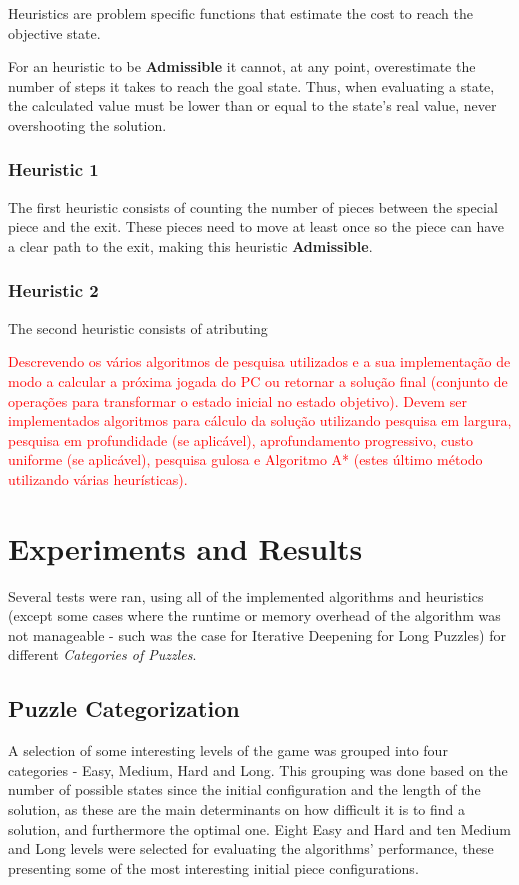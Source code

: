 \documentclass[conference]{IEEEtran}
\begin{document}
Heuristics are problem specific functions that estimate the cost to reach the objective state.

For an heuristic to be \textbf{Admissible} it cannot, at any point, overestimate the number of steps it takes to reach the goal state. Thus, when evaluating a state, the calculated value must be lower than or equal to the state's real value, never overshooting the solution.

\subsubsection{Heuristic 1}

The first heuristic consists of counting the number of pieces between the special piece and the exit. These pieces need to move at least once so the piece can have a clear path to the exit, making this heuristic \textbf{Admissible}.

\subsubsection{Heuristic 2}

The second heuristic consists of atributing 

\textcolor{red}{Descrevendo os vários algoritmos de pesquisa utilizados e a sua implementação de modo a calcular a próxima jogada do PC ou retornar a solução final (conjunto de operações para transformar o estado inicial no estado objetivo). Devem ser implementados algoritmos para cálculo da solução utilizando pesquisa em largura, pesquisa em profundidade (se aplicável), aprofundamento progressivo, custo uniforme (se aplicável), pesquisa gulosa e Algoritmo A* (estes último método utilizando várias heurísticas).}

\section{Experiments and Results}
Several tests were ran, using all of the implemented algorithms and heuristics (except some cases where the runtime or memory overhead of the algorithm was not manageable - such was the case for Iterative Deepening for Long Puzzles) for different \textit{Categories of Puzzles}.

\subsection{Puzzle Categorization}

A selection of some interesting levels of the game was grouped into four categories - Easy, Medium, Hard and Long. This grouping was done based on the number of possible states since the initial configuration and the length of the solution, as these are the main determinants on how difficult it is to find a solution, and furthermore the optimal one. Eight Easy and Hard and ten Medium and Long levels were selected for evaluating the algorithms' performance, these presenting some of the most interesting initial piece configurations.
\end{document}
